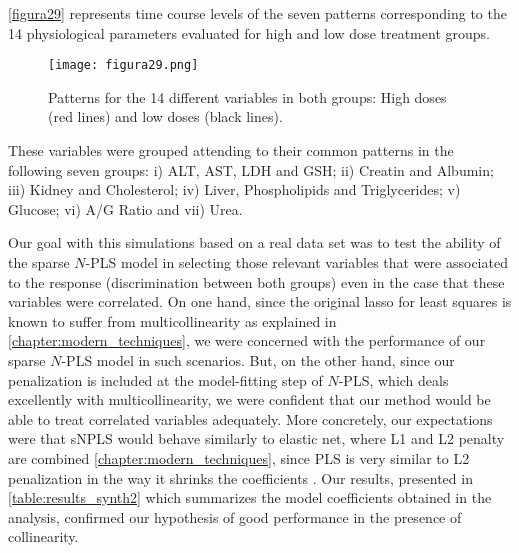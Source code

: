 \autoref{figura29} represents time course levels of the seven patterns corresponding to the 14 physiological parameters evaluated for high and low dose treatment groups. 

\begin{figure}[hbtp]
	\centering
\texttt{[image: figura29.png]}
\caption{Patterns for the 14 different variables in both groups: High doses (red lines) and low doses (black lines).}
\label{figura29}
\end{figure}

These variables were grouped attending to their common patterns in the following seven groups: i) ALT, AST, LDH and GSH; ii) Creatin and Albumin; iii) Kidney and Cholesterol; iv) Liver, Phospholipids and Triglycerides; v) Glucose; vi) A/G Ratio and vii) Urea.

Our goal with this simulations based on a real data set was to test the ability of the sparse $N$-PLS model in selecting those relevant variables that were associated to the response (discrimination between both groups) even in the case that these variables were correlated. On one hand, since the original lasso for least squares is known to suffer from multicollinearity as explained in \autoref{chapter:modern_techniques}, we were concerned with the performance of our sparse $N$-PLS model in such scenarios. But, on the other hand, since our penalization is included at the model-fitting step of $N$-PLS, which deals excellently with multicollinearity, we were confident that our method would be able to treat correlated variables adequately. More concretely, our expectations were that sNPLS would behave similarly to elastic net, where L1 and L2 penalty are combined \autoref{chapter:modern_techniques}, since PLS is very similar to L2 penalization in the way it shrinks the coefficients \parencite{de1995pls}. Our results, presented in \autoref{table:results_synth2} which summarizes the model coefficients obtained in the analysis, confirmed our hypothesis of good performance in the presence of collinearity. 

